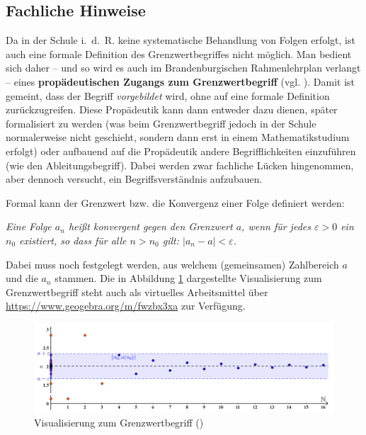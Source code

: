 \documentclass[
]{scrbook}
\theoremstyle{definition}
\theoremstyle{definition}
\theoremstyle{definition}
\theoremstyle{definition}
\theoremstyle{remark}
\begin{document}
\subsection{Fachliche Hinweise}\label{fachliche-hinweise}

Da in der Schule i.~d.~R. keine systematische Behandlung von Folgen erfolgt, ist auch eine formale Definition des Grenzwertbegriffes nicht möglich. Man bedient sich daher -- und so wird es auch im Brandenburgischen Rahmenlehrplan verlangt -- eines \textbf{propädeutischen Zugangs zum Grenzwertbegriff} (vgl. ). Damit ist gemeint, dass der Begriff \emph{vorgebildet} wird, ohne auf eine formale Definition zurückzugreifen. Diese Propädeutik kann dann entweder dazu dienen, später formalisiert zu werden (was beim Grenzwertbegriff jedoch in der Schule normalerweise nicht geschieht, sondern dann erst in einem Mathematikstudium erfolgt) oder aufbauend auf die Propädeutik andere Begrifflichkeiten einzuführen (wie den Ableitungsbegriff). Dabei werden zwar fachliche Lücken hingenommen, aber dennoch versucht, ein Begriffsverständnis aufzubauen.

Formal kann der Grenzwert bzw. die Konvergenz einer Folge definiert werden:

\emph{Eine Folge \(a_n\) heißt konvergent gegen den Grenzwert \(a\), wenn für jedes \(\varepsilon > 0\) ein \(n_0\) existiert, so dass für alle \(n>n_0\) gilt: \(|a_n-a| < \varepsilon\).}

Dabei muss noch festgelegt werden, aus welchem (gemeinsamen) Zahlbereich \(a\) und die \(a_n\) stammen. Die in Abbildung \ref{fig:Grenzwert} dargestellte Visualisierung zum Grenzwertbegriff steht auch als virtuelles Arbeitsmittel über \url{https://www.geogebra.org/m/fwzbx3xa} zur Verfügung.



\begin{figure}

{\centering \includegraphics[width=0.9\linewidth]{pictures/10-Grenzwert} 

}

\caption{Visualisierung zum Grenzwertbegriff ()}\label{fig:Grenzwert}
\end{figure}
\end{document}
